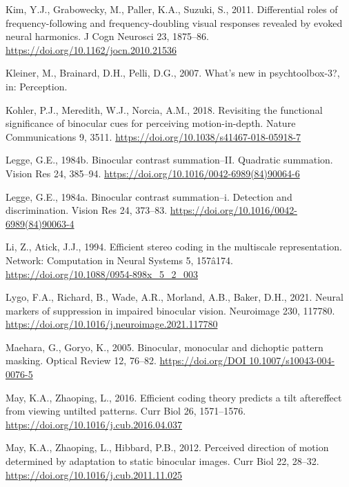 \documentclass[
  12pt,
]{article}
\newlength{\cslhangindent}
\newenvironment{CSLReferences}[2] %
 {\begin{list}{}{%
  \setlength{\itemindent}{0pt}
  \setlength{\leftmargin}{0pt}
  \setlength{\parsep}{0pt}
  \ifodd #1
   \setlength{\leftmargin}{\cslhangindent}
   \setlength{\itemindent}{-1\cslhangindent}
  \fi
  \setlength{\itemsep}{#2\baselineskip}}}
 {\end{list}}
\begin{document}
\begin{CSLReferences}{1}{0}
Kim, Y.J., Grabowecky, M., Paller, K.A., Suzuki, S., 2011. Differential
roles of frequency-following and frequency-doubling visual responses
revealed by evoked neural harmonics. J Cogn Neurosci 23, 1875--86.
\url{https://doi.org/10.1162/jocn.2010.21536}

Kleiner, M., Brainard, D.H., Pelli, D.G., 2007. What's new in
psychtoolbox-3?, in: Perception.

Kohler, P.J., Meredith, W.J., Norcia, A.M., 2018. Revisiting the
functional significance of binocular cues for perceiving
motion-in-depth. Nature Communications 9, 3511.
\url{https://doi.org/10.1038/s41467-018-05918-7}

Legge, G.E., 1984b. Binocular contrast summation--II. Quadratic
summation. Vision Res 24, 385--94.
\url{https://doi.org/10.1016/0042-6989(84)90064-6}

Legge, G.E., 1984a. Binocular contrast summation--i. Detection and
discrimination. Vision Res 24, 373--83.
\url{https://doi.org/10.1016/0042-6989(84)90063-4}

Li, Z., Atick, J.J., 1994. Efficient stereo coding in the multiscale
representation. Network: Computation in Neural Systems 5, 157â174.
\url{https://doi.org/10.1088/0954-898x_5_2_003}

Lygo, F.A., Richard, B., Wade, A.R., Morland, A.B., Baker, D.H., 2021.
Neural markers of suppression in impaired binocular vision. Neuroimage
230, 117780. \url{https://doi.org/10.1016/j.neuroimage.2021.117780}

Maehara, G., Goryo, K., 2005. Binocular, monocular and dichoptic pattern
masking. Optical Review 12, 76--82.
\href{https://doi.org/DOI\%2010.1007/s10043-004-0076-5}{https://doi.org/DOI
10.1007/s10043-004-0076-5}

May, K.A., Zhaoping, L., 2016. Efficient coding theory predicts a tilt
aftereffect from viewing untilted patterns. Curr Biol 26, 1571--1576.
\url{https://doi.org/10.1016/j.cub.2016.04.037}

May, K.A., Zhaoping, L., Hibbard, P.B., 2012. Perceived direction of
motion determined by adaptation to static binocular images. Curr Biol
22, 28--32. \url{https://doi.org/10.1016/j.cub.2011.11.025}


\end{CSLReferences}
\end{document}
